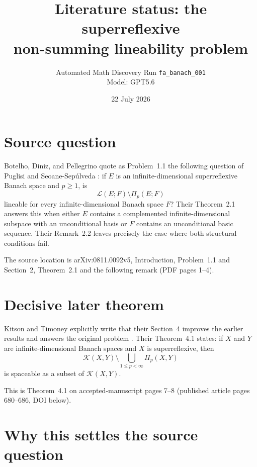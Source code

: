 \documentclass[11pt]{article}
\title{Literature status: the superreflexive\\non-summing lineability problem}
\author{Automated Math Discovery Run \texttt{fa\_banach\_001}\\Model: GPT5.6}
\date{22 July 2026}
\begin{document}
\maketitle

\begin{center}
\end{center}

\section*{Source question}

Botelho, Diniz, and Pellegrino quote as Problem~1.1 the following question
of Puglisi and Seoane-Sep\'{u}lveda \cite{BDP}: if $E$ is an
infinite-dimensional superreflexive Banach space and $p\geq1$, is
\[
  \mathcal L(E;F)\setminus\Pi_p(E;F)
\]
lineable for every infinite-dimensional Banach space $F$? Their Theorem~2.1
answers this when either $E$ contains a complemented infinite-dimensional
subspace with an unconditional basis or $F$ contains an unconditional basic
sequence. Their Remark~2.2 leaves precisely the case where both structural
conditions fail.

The source location is arXiv:0811.0092v5, Introduction, Problem~1.1 and
Section~2, Theorem~2.1 and the following remark (PDF pages 1--4).

\section*{Decisive later theorem}

Kitson and Timoney explicitly write that their Section~4 improves the earlier
results and answers the original problem \cite{KT}. Their Theorem~4.1 states:
if $X$ and $Y$ are infinite-dimensional Banach spaces and $X$ is
superreflexive, then
\[
  \mathcal K(X,Y)\setminus
  \bigcup_{1\leq p<\infty}\Pi_p(X,Y)
\]
is spaceable as a subset of $\mathcal K(X,Y)$.

This is Theorem~4.1 on accepted-manuscript pages 7--8 (published article
pages 680--686, DOI below).

\section*{Why this settles the source question}
\end{document}

